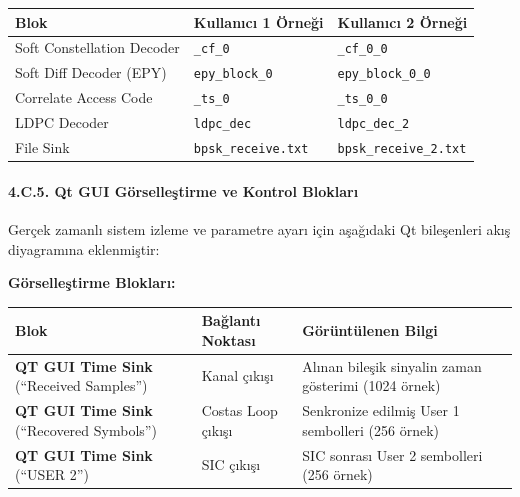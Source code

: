 \documentclass[
]{IEEEtran}
\newcounter{none} %
\begin{document}
{\def\LTcaptype{none} %
\begin{longtable}[]{@{}lll@{}}
\toprule\noalign{}
Blok & Kullanıcı 1 Örneği & Kullanıcı 2 Örneği \\
\midrule\noalign{}
\endhead
\bottomrule\noalign{}
\endlastfoot
Soft Constellation Decoder & \texttt{\_cf\_0} & \texttt{\_cf\_0\_0} \\
Soft Diff Decoder (EPY) & \texttt{epy\_block\_0} &
\texttt{epy\_block\_0\_0} \\
Correlate Access Code & \texttt{\_ts\_0} & \texttt{\_ts\_0\_0} \\
LDPC Decoder & \texttt{ldpc\_dec} & \texttt{ldpc\_dec\_2} \\
File Sink & \texttt{bpsk\_receive.txt} &
\texttt{bpsk\_receive\_2.txt} \\
\end{longtable}
}

\paragraph{4.C.5. Qt GUI Görselleştirme ve Kontrol
Blokları}\label{c.5.-qt-gui-guxf6rselleux15ftirme-ve-kontrol-bloklarux131}

Gerçek zamanlı sistem izleme ve parametre ayarı için aşağıdaki Qt
bileşenleri akış diyagramına eklenmiştir:

\textbf{Görselleştirme Blokları:}

{\def\LTcaptype{none} %
\begin{longtable}[]{@{}
  >{\raggedright\arraybackslash}p{}
  >{\raggedright\arraybackslash}p{}
  >{\raggedright\arraybackslash}p{}@{}}
\toprule\noalign{}
\begin{minipage}[b]{\linewidth}\raggedright
Blok
\end{minipage} & \begin{minipage}[b]{\linewidth}\raggedright
Bağlantı Noktası
\end{minipage} & \begin{minipage}[b]{\linewidth}\raggedright
Görüntülenen Bilgi
\end{minipage} \\
\midrule\noalign{}
\endhead
\bottomrule\noalign{}
\endlastfoot
\textbf{QT GUI Time Sink} (``Received Samples'') & Kanal çıkışı & Alınan
bileşik sinyalin zaman gösterimi (1024 örnek) \\
\textbf{QT GUI Time Sink} (``Recovered Symbols'') & Costas Loop çıkışı &
Senkronize edilmiş User 1 sembolleri (256 örnek) \\
\textbf{QT GUI Time Sink} (``USER 2'') & SIC çıkışı & SIC sonrası User 2
sembolleri (256 örnek) \\
\end{longtable}
}
\end{document}
